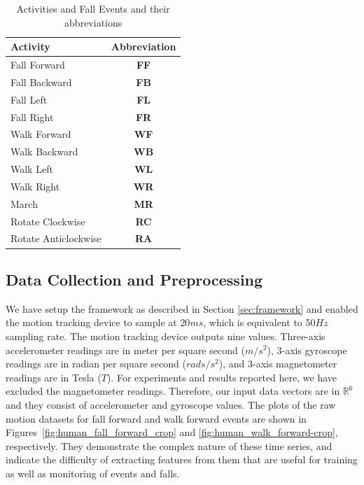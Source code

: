 \documentclass[]{IEEEtran}
\begin{document}
\begin{table}[htb]
\caption{Activities and Fall Events and their abbreviations}
\centering
{
\begin{tabular}{|l|c|}
\hline
\textbf{Activity} & \textbf{Abbreviation} \\  \hline
Fall Forward &\textbf{FF} \\ \hline
Fall Backward &\textbf{FB}  \\ \hline
Fall Left &\textbf{FL}  \\ \hline
Fall Right &\textbf{FR}  \\ \hline \hline
Walk Forward &\textbf{WF} \\ \hline
Walk Backward &\textbf{WB} \\ \hline
Walk Left &\textbf{WL} \\ \hline
Walk Right &\textbf{WR}  \\ \hline
March &\textbf{MR}  \\ \hline
Rotate Clockwise &\textbf{RC} \\ \hline
Rotate Anticlockwise&\textbf{RA}  \\ \hline
\end{tabular}
}
\label{Tbl:ListOfActivities}
\end{table}

\subsection{Data Collection and Preprocessing  }
\label{subsec:preDataCollection}

We have setup the framework as described in Section \ref{sec:framework} and
enabled the motion tracking device to sample at $20ms$, which is equivalent to
50$Hz$ sampling rate. The motion tracking device outputs nine values.
Three-axis  accelerometer readings are in  meter per square second ($m/s^2$),
3-axis gyroscope readings are in radian per square second ($rads/s^2$), and
3-axis magnetometer readings are  in Tesla ($T$). For experiments  and results
reported here, we have excluded the magnetometer readings. Therefore, our input
data vectors  are in $\mathbb{R}^6$ and they consist of accelerometer and
gyroscope values. The plots of the raw motion datasets for fall forward and
walk forward events are shown in Figures~\ref{fig:human_fall_forward_crop} and
\ref{fig:human_walk_forward-crop}, respectively. They demonstrate the complex
nature of these time series, and indicate the difficulty of extracting features
from them that are useful for training as well as monitoring of events and
falls.
\end{document}
